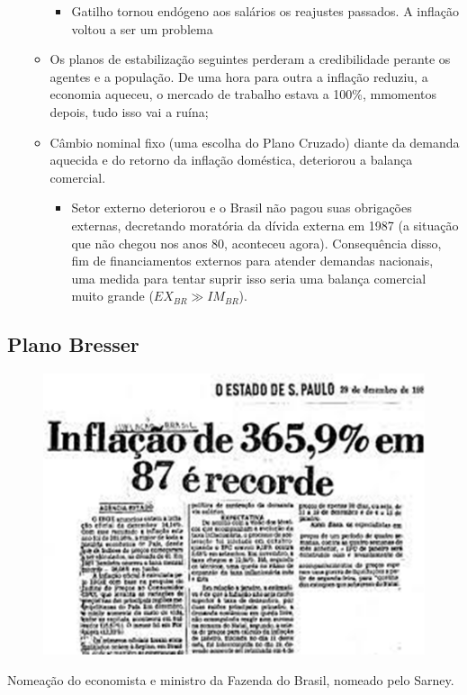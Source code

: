 \documentclass[a4paper,12pt]{article}[abntex2]
\begin{document}
\begin{itemize}
\begin{itemize}
\begin{itemize}
            \item Gatilho tornou endógeno aos salários os reajustes passados. A inflação voltou a ser um problema 
        \end{itemize}
    \item Os planos de estabilização seguintes perderam a credibilidade perante os agentes e a população. De uma hora para outra a inflação reduziu, a economia aqueceu, o mercado de trabalho estava a 100\%, mmomentos depois, tudo isso vai a ruína;
    \item Câmbio nominal fixo (uma escolha do Plano Cruzado) diante da demanda aquecida e do retorno da inflação doméstica, deteriorou a balança comercial.\begin{itemize}
            \item Setor externo deteriorou e o Brasil não pagou suas obrigações externas, decretando moratória da dívida externa em 1987 (a situação que não chegou nos anos 80, aconteceu agora). Consequência disso, fim de financiamentos externos para atender demandas nacionais, uma medida para tentar suprir isso seria uma balança comercial muito grande (\(EX_{BR} \gg IM_{BR}\)).
         \end{itemize}
    \end{itemize}
\end{itemize}

\subsection{\textbf{Plano Bresser}}

\begin{figure}[H]
    \centering
    \includegraphics[width=0.7\linewidth]{Imagens/a11i2.png}
\end{figure}

Nomeação do economista e ministro da Fazenda do Brasil, nomeado pelo Sarney.
\end{document}
